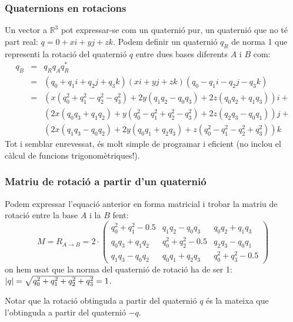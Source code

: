 \documentclass{beamer}
\begin{document}
\begin{frame}
  \frametitle{Quaternions en rotacions}
  Un vector a $\mathbb{R}^3$ pot expressar-se com un quaternió pur, un quaternió que no té part real: $q=0+xi+yj+zk$. Podem definir un quaternió $q_R$ de norma 1 que representi la rotació del quaternió $q$ entre dues bases diferents $A$ i $B$ com:
 \small
  \begin{eqnarray}
    q_B&=& q_Rq_Aq_R^*\\\nonumber
                &=& (q_0+q_1i+q_2j+q_3k)(xi+yj+zk)(q_0-q_1i-q_2j-q_3k)\\\nonumber
                &=& (x(q_0^2+q_1^2-q_2^2-q_3^2)+2y(q_1q_2-q_0q_3)+2z(q_0q_2+q_1q_3))i+\\\nonumber
                &&  (2x(q_0q_3+q_1q_2)+y(q_0^2-q_1^2+q_2^2-q_3^2)+2z(q_2q_3-q_0q_1))j+\\\nonumber
                &&  (2x(q_1q_3-q_0q_2)+2y(q_0q_1+q_2q_3)+z(q_0^2-q_1^2-q_2^2+q_3^2))k
                \label{eq:quatrot}
  \end{eqnarray}
  \normalsize
  Tot i semblar enrevessat, és molt simple de programar i eficient (no inclou el càlcul de funcions trigonomètriques!).
\end{frame}

\begin{frame}
  \frametitle{Matriu de rotació a partir d'un quaternió}
  Podem expressar l'equació anterior en forma matricial i trobar la matriu de rotació entre la base $A$ i la $B$ fent:
  \[
    M=R_{A\rightarrow B}=2\cdot \begin{pmatrix}
    q_0^2+q_1^2-0.5 & q_1q_2-q_0q_3 & q_0q_2+q_1q_3 \\
    q_0q_3+q_1q_2 & q_0^2+q_2^2-0.5 & q_2q_3-q_0q_1 \\
    q_1q_3-q_0q_2 & q_0q_1+q_2q_3 & q_0^2+q_3^2-0.5
  \end{pmatrix}
  \]
  on hem usat que la norma del quaternió de rotació ha de ser 1: $\abs{q}=\sqrt{q_0^2+q_1^2+q_2^2+q_3^2}=1$.

  Notar que la rotació obtinguda a partir del quaternió $q$ és la mateixa que l'obtinguda a partir del quaternió $-q$.
\end{frame}
\end{document}
